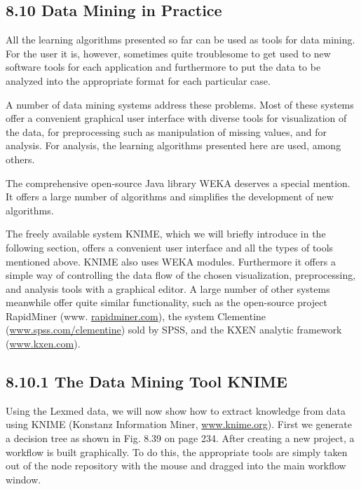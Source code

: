 \documentclass[10pt]{book}
\begin{document}
\begin{center}
\begin{enumerate}
\begin{center}
\begin{center}
\begin{center}
\subsection*{8.10 Data Mining in Practice}
All the learning algorithms presented so far can be used as tools for data mining. For the user it is, however, sometimes quite troublesome to get used to new software tools for each application and furthermore to put the data to be analyzed into the appropriate format for each particular case.

A number of data mining systems address these problems. Most of these systems offer a convenient graphical user interface with diverse tools for visualization of the data, for preprocessing such as manipulation of missing values, and for analysis. For analysis, the learning algorithms presented here are used, among others.

The comprehensive open-source Java library WEKA deserves a special mention. It offers a large number of algorithms and simplifies the development of new algorithms.

The freely available system KNIME, which we will briefly introduce in the following section, offers a convenient user interface and all the types of tools mentioned above. KNIME also uses WEKA modules. Furthermore it offers a simple way of controlling the data flow of the chosen visualization, preprocessing, and analysis tools with a graphical editor. A large number of other systems meanwhile offer quite similar functionality, such as the open-source project RapidMiner (www. \href{http://rapidminer.com}{rapidminer.com}), the system Clementine (\href{http://www.spss.com/clementine}{www.spss.com/clementine}) sold by SPSS, and the KXEN analytic framework (\href{http://www.kxen.com}{www.kxen.com}).

\subsection*{8.10.1 The Data Mining Tool KNIME}
Using the Lexmed data, we will now show how to extract knowledge from data using KNIME (Konstanz Information Miner, \href{http://www.knime.org}{www.knime.org}). First we generate a decision tree as shown in Fig. 8.39 on page 234. After creating a new project, a workflow is built graphically. To do this, the appropriate tools are simply taken out of the node repository with the mouse and dragged into the main workflow window.


\end{center}
\end{center}
\end{center}
\end{enumerate}
\end{center}
\end{document}
